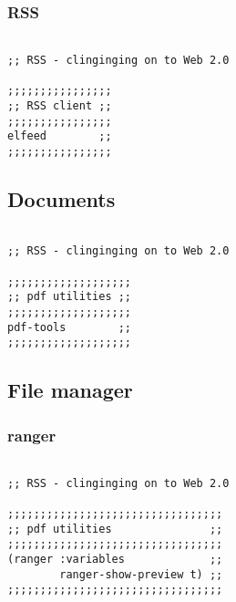 \documentclass[11pt]{article}
\begin{document}
\subsubsection{RSS}
\label{sec:org9a4e47b}
\begin{verbatim}

;; RSS - clinginging on to Web 2.0

;;;;;;;;;;;;;;;;
;; RSS client ;;
;;;;;;;;;;;;;;;;
elfeed        ;;
;;;;;;;;;;;;;;;;
\end{verbatim}

\subsection{Documents}
\label{sec:orgfe4e628}

\begin{verbatim}

;; RSS - clinginging on to Web 2.0

;;;;;;;;;;;;;;;;;;;
;; pdf utilities ;;
;;;;;;;;;;;;;;;;;;;
pdf-tools        ;;
;;;;;;;;;;;;;;;;;;;
\end{verbatim}

\subsection{File manager}
\label{sec:org1bd5a01}
\subsubsection{ranger}
\label{sec:org8e0dfbe}

\begin{verbatim}

;; RSS - clinginging on to Web 2.0

;;;;;;;;;;;;;;;;;;;;;;;;;;;;;;;;;
;; pdf utilities               ;;
;;;;;;;;;;;;;;;;;;;;;;;;;;;;;;;;;
(ranger :variables             ;;
        ranger-show-preview t) ;;
;;;;;;;;;;;;;;;;;;;;;;;;;;;;;;;;;
\end{verbatim}
\end{document}
